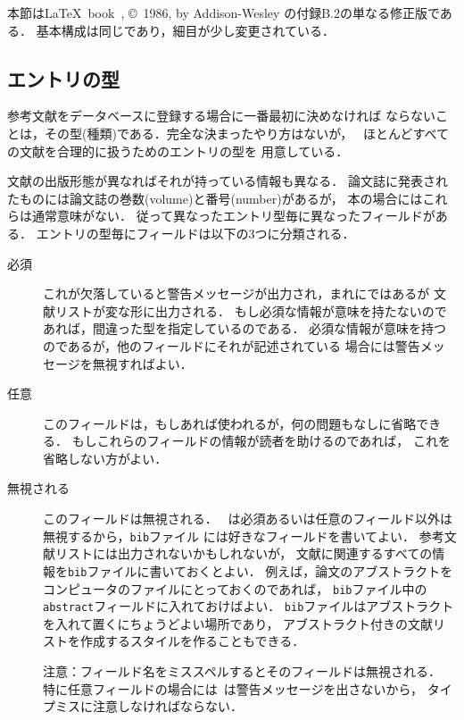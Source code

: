 本節は\LaTeX\ book~\cite{latex},
\copyright~1986, by Addison-Wesley の付録B.2の単なる修正版である．
基本構成は同じであり，細目が少し変更されている．

\subsection{エントリの型}

参考文献をデータベースに登録する場合に一番最初に決めなければ
ならないことは，その型(種類)である．完全な決まったやり方はないが，
\BibTeX\ ほとんどすべての文献を合理的に扱うためのエントリの型を
用意している．

文献の出版形態が異なればそれが持っている情報も異なる．
論文誌に発表されたものには論文誌の巻数(volume)と番号(number)があるが，
本の場合にはこれらは通常意味がない．
従って異なったエントリ型毎に異なったフィールドがある．
エントリの型毎にフィールドは以下の3つに分類される．
\begin{description}

\item[必須]
これが欠落していると警告メッセージが出力され，まれにではあるが
文献リストが変な形に出力される．
もし必須な情報が意味を持たないのであれば，間違った型を指定しているのである．
必須な情報が意味を持つのであるが，他のフィールドにそれが記述されている
場合には警告メッセージを無視すればよい．

\item[任意]
このフィールドは，もしあれば使われるが，何の問題もなしに省略できる．
もしこれらのフィールドの情報が読者を助けるのであれば，
これを省略しない方がよい．

\item[無視される]
このフィールドは無視される．
\BibTeX\ は必須あるいは任意のフィールド以外は無視するから，{\tt bib}ファイル
には好きなフィールドを書いてよい．
参考文献リストには出力されないかもしれないが，
文献に関連するすべての情報を{\tt bib}ファイルに書いておくとよい．
例えば，論文のアブストラクトをコンピュータのファイルにとっておくのであれば，
{\tt bib}ファイル中の{\tt abstract}フィールドに入れておけばよい．
{\tt bib}ファイルはアブストラクトを入れて置くにちょうどよい場所であり，
アブストラクト付きの文献リストを作成するスタイルを作ることもできる．

{\dg 注意}：フィールド名をミススペルするとそのフィールドは無視される．
特に任意フィールドの場合には\BibTeX\ は警告メッセージを出さないから，
タイプミスに注意しなければならない．

\end{description}

